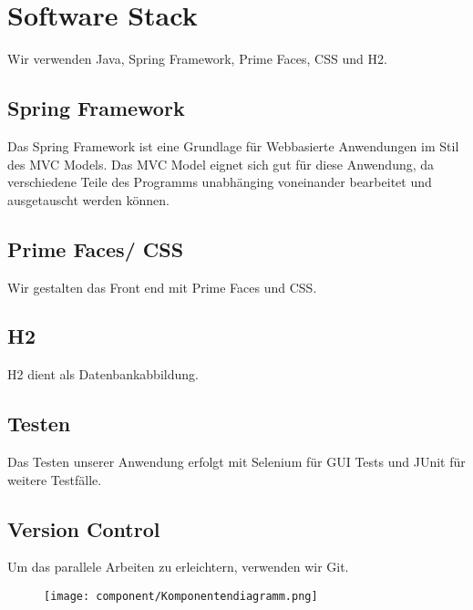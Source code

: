 \newpage
\section{Software Stack}
Wir verwenden Java, Spring Framework, Prime Faces, CSS und H2. 

\subsection{Spring Framework}
Das Spring Framework ist eine Grundlage für Webbasierte Anwendungen im Stil des MVC Models. Das MVC Model eignet sich gut für diese Anwendung, da verschiedene Teile des Programms unabhänging voneinander bearbeitet und ausgetauscht werden können.

\subsection{Prime Faces/ CSS}
Wir gestalten das Front end mit Prime Faces und CSS.

\subsection{H2}
H2 dient als Datenbankabbildung.

\subsection{Testen}
Das Testen unserer Anwendung erfolgt mit Selenium für GUI Tests und JUnit für weitere Testfälle.

\subsection{Version Control}
Um das parallele Arbeiten zu erleichtern, verwenden wir Git.


\newpage
\begin{figure}
\texttt{[image: component/Komponentendiagramm.png]}
\end{figure}
